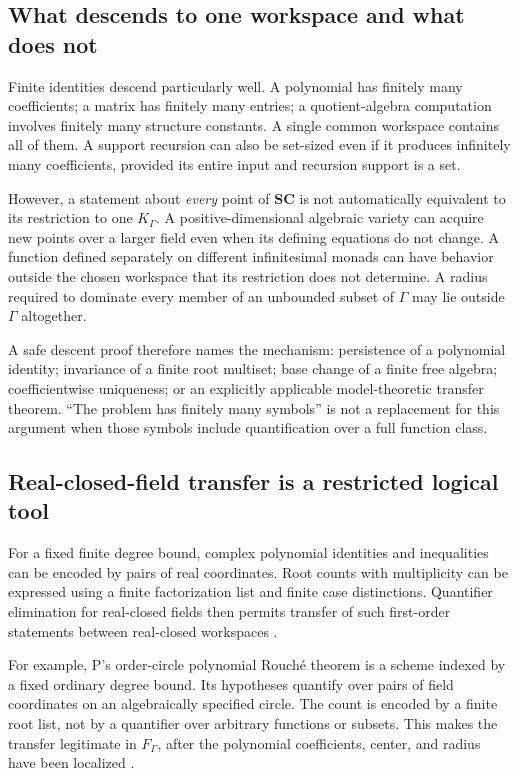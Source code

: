 \documentclass[11pt,letterpaper]{article}
\numberwithin{equation}{section}
\theoremstyle{definition}
\theoremstyle{remark}
\newcommand{\SC}{\mathbf{SC}}
\begin{document}
\subsection{What descends to one workspace and what does not}
Finite identities descend particularly well. A polynomial has finitely many coefficients; a matrix has finitely many entries; a quotient-algebra computation involves finitely many structure constants. A single common workspace contains all of them. A support recursion can also be set-sized even if it produces infinitely many coefficients, provided its entire input and recursion support is a set.

However, a statement about \emph{every} point of $\SC$ is not automatically equivalent to its restriction to one $K_\Gamma$. A positive-dimensional algebraic variety can acquire new points over a larger field even when its defining equations do not change. A function defined separately on different infinitesimal monads can have behavior outside the chosen workspace that its restriction does not determine. A radius required to dominate every member of an unbounded subset of $\Gamma$ may lie outside $\Gamma$ altogether.

A safe descent proof therefore names the mechanism: persistence of a polynomial identity; invariance of a finite root multiset; base change of a finite free algebra; coefficientwise uniqueness; or an explicitly applicable model-theoretic transfer theorem. ``The problem has finitely many symbols'' is not a replacement for this argument when those symbols include quantification over a full function class.

\subsection{Real-closed-field transfer is a restricted logical tool}
For a fixed finite degree bound, complex polynomial identities and inequalities can be encoded by pairs of real coordinates. Root counts with multiplicity can be expressed using a finite factorization list and finite case distinctions. Quantifier elimination for real-closed fields then permits transfer of such first-order statements between real-closed workspaces \cite{Tarski}.

For example, P's order-circle polynomial Rouch\'e theorem is a scheme indexed by a fixed ordinary degree bound. Its hypotheses quantify over pairs of field coordinates on an algebraically specified circle. The count is encoded by a finite root list, not by a quantifier over arbitrary functions or subsets. This makes the transfer legitimate in $F_\Gamma$, after the polynomial coefficients, center, and radius have been localized \cite{SourceP}.
\end{document}
